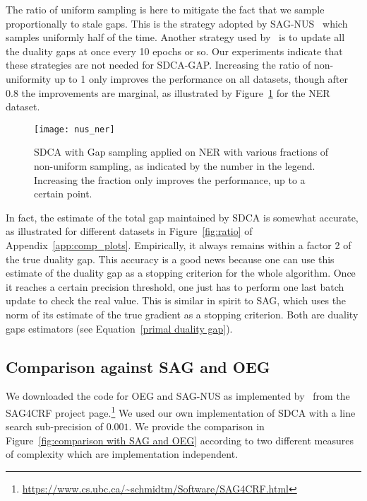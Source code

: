 The ratio of uniform sampling is here to mitigate the fact that we sample proportionally to stale gaps.
This is the strategy adopted by SAG-NUS~\citep{schmidt2015non} which samples uniformly half of the time.
Another strategy used by~\citet{osokin2016minding} is to update all the duality gaps at once every 10 epochs or so.
Our experiments indicate that these strategies are not needed for SDCA-GAP.
Increasing the ratio of non-uniformity up to 1 only improves the performance on all datasets, though after 0.8 the improvements are marginal, as illustrated by Figure~\ref{fig:non-uniformity} for the NER dataset.
\begin{figure}[t]
\centering \texttt{[image: nus\_ner]}
\caption[SDCA with Gap sampling applied on NER]{SDCA with Gap sampling applied on NER with various fractions of non-uniform sampling, as indicated by the number in the legend.
Increasing the fraction only improves the performance, up to a certain point.}
\label{fig:non-uniformity}
\end{figure}

In fact, the estimate of the total gap maintained by SDCA is somewhat accurate, as illustrated for different datasets in Figure~\ref{fig:ratio} of Appendix~\ref{app:comp_plots}.
Empirically, it always remains within a factor 2 of the true duality gap.
This accuracy is a good news because one can use this estimate of the duality gap as a stopping criterion for the whole algorithm.
Once it reaches a certain precision threshold, one just has to perform one last batch update to check the real value.
This is similar in spirit to SAG, which uses the norm of its estimate of the true gradient as a stopping criterion.
Both are duality gaps estimators (see Equation~\eqref{primal duality gap}).


\subsection{Comparison against SAG and OEG}

We downloaded the code for OEG and SAG-NUS as implemented by~\citet{schmidt2015non} from the SAG4CRF project page.\footnote{\url{https://www.cs.ubc.ca/~schmidtm/Software/SAG4CRF.html}}
We used our own implementation of SDCA with a line search sub-precision of $0.001$.
We provide the comparison in Figure~\ref{fig:comparison with SAG and OEG} according to two different measures of complexity which are implementation independent.

